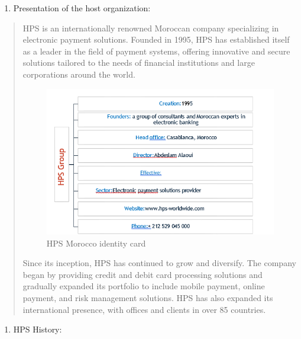 \documentclass[12pt,a4paper]{report}
\begin{document}
\begin{enumerate}
\def\labelenumi{\arabic{enumi}.}
\item
  \protect\hypertarget{_Toc201954395}{}{}Presentation of the host organization:
\end{enumerate}

\begin{quote}
HPS is an internationally renowned Moroccan company specializing in
electronic payment solutions. Founded in 1995, HPS has established
itself as a leader in the field of payment systems, offering innovative
and secure solutions tailored to the needs of financial institutions and
large corporations around the world.

\begin{figure}[H]
\centering
\includegraphics[width=5.41667in]{vertopal_d1b0b2209edd4c6aa8254f57daa0953b/media/infosHPS.png}
\caption{HPS Morocco identity card}
\label{fig:infosHPS}
\end{figure}


Since its inception, HPS has continued to grow and diversify. The company
began by providing credit and debit card processing solutions and
gradually expanded its portfolio to include mobile payment, online
payment, and risk management solutions. HPS has also expanded its
international presence, with offices and clients in over 85 countries.
\end{quote}



\begin{enumerate}
\def\labelenumi{\arabic{enumi}.}
\setcounter{enumi}{1}
\item
  \protect\hypertarget{_Toc201954396}{}{}HPS History:
\end{enumerate}
\end{document}
